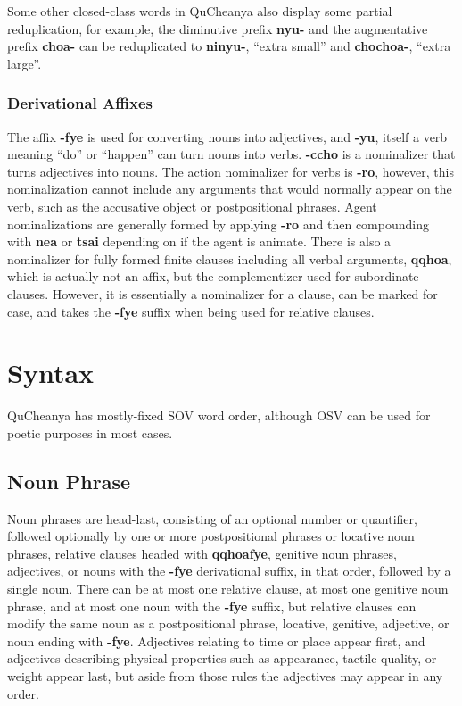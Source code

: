 \documentclass{article}
\begin{document}
Some other closed-class words in QuCheanya also display some partial reduplication, for example, the diminutive prefix \textbf{nyu-} and the augmentative prefix \textbf{choa-} can be reduplicated to \textbf{ninyu-}, ``extra small'' and \textbf{chochoa-}, ``extra large''.

\subsubsection{Derivational Affixes}

The affix \textbf{-fye} is used for converting nouns into adjectives, and \textbf{-yu}, itself a verb meaning ``do'' or ``happen'' can turn nouns into verbs. \textbf{-ccho} is a nominalizer that turns adjectives into nouns. The action nominalizer for verbs is \textbf{-ro}, however, this nominalization cannot include any arguments that would normally appear on the verb, such as the accusative object or postpositional phrases.  Agent nominalizations are generally formed by applying \textbf{-ro} and then compounding with \textbf{nea} or \textbf{tsai} depending on if the agent is animate.  There is also a nominalizer for fully formed finite clauses including all verbal arguments, \textbf{qqhoa}, which is actually not an affix, but the complementizer used for subordinate clauses. However, it is essentially a nominalizer for a clause, can be marked for case, and takes the \textbf{-fye} suffix when being used for relative clauses.

\section{Syntax}

QuCheanya has mostly-fixed SOV word order, although OSV can be used for poetic purposes in most cases.

\subsection{Noun Phrase}

Noun phrases are head-last, consisting of an optional number or quantifier, followed optionally by one or more postpositional phrases or locative noun phrases, relative clauses headed with \textbf{qqhoafye}, genitive noun phrases, adjectives, or nouns with the \textbf{-fye} derivational suffix, in that order, followed by a single noun.  There can be at most one relative clause, at most one genitive noun phrase, and at most one noun with the \textbf{-fye} suffix, but relative clauses can modify the same noun as a postpositional phrase, locative, genitive, adjective, or noun ending with \textbf{-fye}.  Adjectives relating to time or place appear first, and adjectives describing physical properties such as appearance, tactile quality, or weight appear last, but aside from those rules the adjectives may appear in any order.
\end{document}

